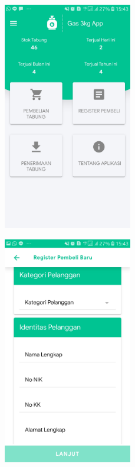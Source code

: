 	\begin{figure}[H]
		\centering
		\begin{minipage}[b]{0.4\linewidth}
			\centering
			\includegraphics [width = \linewidth, height=10cm]{gambar/android/beranda}
			\label{tampilanBerandaPangkalan}
		\end{minipage}
		\begin{minipage}[b]{0.4\linewidth}
			\centering
			\includegraphics [width = \linewidth, height=10cm]{gambar/android/register}
			\label{tampilanRegisterPangkalan}
		\end{minipage}
		
	\end{figure}

